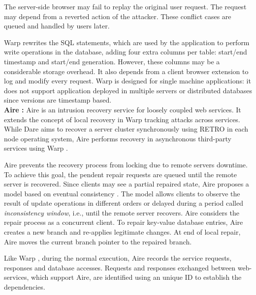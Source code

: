 The server-side browser may fail to replay the original user request. The request may depend from a reverted action of the attacker. These conflict cases are queued and handled by users later. 

Warp rewrites the \ac{SQL} statements, which are used by the application to perform write operations in the database, adding four extra columns per table: start/end timestamp and start/end generation. However, these columns may be a considerable storage overhead. It also depends from a client browser extension to log and modify every request. Warp is designed for single machine applications: it does not support application deployed in multiple servers or distributed databases since versions are timestamp based. \\


\textbf{Aire \cite{aire}:} Aire is an intrusion recovery service for loosely coupled web services. It extends the concept of local recovery in Warp \cite{warp} tracking attacks across services. While Dare \cite{dare} aims to recover a server cluster synchronously using RETRO \cite{retro} in each node operating system, Aire performs recovery in asynchronous third-party services using Warp \cite{warp}. 

Aire prevents the recovery process from locking due to remote servers downtime. To achieve this goal, the pendent repair requests are queued until the remote server is recovered. Since clients may see a partial repaired state, Aire proposes a model based on eventual consistency \cite{Decandia2007,Vogels2009}. The model allows clients to observe the result of update operations in different orders or delayed during a period called \textit{inconsistency window}, i.e., until the remote server recovers. Aire considers the repair process as a concurrent client. To repair key-value database entries, Aire creates a new branch \cite{git} and re-applies legitimate changes. At end of local repair, Aire moves the current branch pointer to the repaired branch.

Like Warp \cite{warp}, during the normal execution, Aire records the service requests, responses and database accesses. Requests and responses exchanged between web-services, which support Aire, are identified using an unique ID to establish the dependencies.


